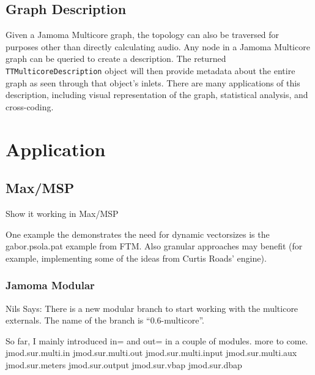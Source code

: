 \documentclass[twoside,a4paper]{article}
\begin{document}


\subsection{Graph Description} %

Given a Jamoma Multicore graph, the topology can also be traversed for purposes other than directly calculating audio.  
Any node in a Jamoma Multicore graph can be queried to create a description.  The returned \texttt{TTMulticoreDescription} object will then provide 
metadata about the entire graph as seen through that object's inlets.  
There are many applications of this description, including visual representation of the graph, statistical analysis, and cross-coding.







\section{Application} %

\subsection{Max/MSP} %

Show it working in Max/MSP

One example the demonstrates the need for dynamic vectorsizes is the gabor.psola.pat example from FTM. Also granular approaches may benefit (for example, implementing some of the ideas from Curtis Roads' engine).


\subsubsection{Jamoma Modular} %


Nils Says:
There is a new modular branch to start working with the multicore 
externals. The name of the branch is ``0.6-multicore''.

So far, I mainly introduced in= and out= in a couple of modules. more to come.
jmod.sur.multi.in
jmod.sur.multi.out
jmod.sur.multi.input
jmod.sur.multi.aux
jmod.sur.meters
jmod.sur.output
jmod.sur.vbap
jmod.sur.dbap
\end{document}
